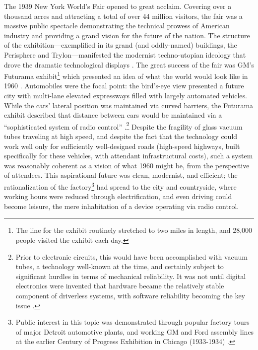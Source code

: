 
The 1939 New York World's Fair opened to great acclaim. Covering over
a thousand acres and attracting a total of over 44 million visitors,
the fair was a massive public spectacle demonstrating the technical
prowess of American industry and providing a grand vision for the
future of the nation. The structure of the exhibition---exemplified in
its grand (and oddly-named) buildings, the Perisphere and
Trylon---manifested the modernist techno-utopian ideology that drove the
dramatic technological displays \cite[p. 371]{nyeElectrifying}. The
great success of the fair was 
GM's Futurama exhibit\footnote{The line for the exhibit routinely stretched to
two miles in length, and 28,000 people visited the exhibit each day.}
which presented an idea of what the world would look
like in 1960 \cite[p. 3-4]{wetmore}. Automobiles were the focal
point: the bird's-eye view presented a 
future city with multi-lane elevated expressways filled with largely
automated vehicles. While the cars' lateral position was maintained via
curved barriers, the Futurama exhibit described that distance
between cars would be maintained via a ``sophisticated system of radio
control'' \cite[p. 5]{wetmore}.\footnote{Prior to electronic circuits, this would have been
accomplished with vacuum tubes, a technology well-known at the time,
and certainly subject to significant hurdles in terms of mechanical
reliability. It was not until digital electronics were invented that
hardware became the relatively stable component of driverless systems,
with software reliability becoming the key issue \cite[p.
  15]{wetmore}.} Despite the 
fragility of glass vacuum tubes traveling at high speed, and despite the fact
that the technology could work well only for sufficiently
well-designed roads (high-speed highways, built specifically for these
vehicles, with attendant infrastructural costs), such a system was
reasonably coherent as a vision of what 1960 might be, from the
perspective of attendees. This aspirational future was clean,
modernist, and efficient; the rationalization of the
factory\footnote{Public interest in this topic was demonstrated through
  popular factory tours of major Detroit automotive 
  plants, and 
working GM and Ford assembly lines at the earlier Century of Progress
Exhibition in Chicago (1933-1934) \cite[p. 63-64]{nyeAmericas}.} had
spread to the city and 
countryside, where working hours were reduced through electrification,
and even driving could become leisure, the mere inhabitation of a
device operating via radio control.

